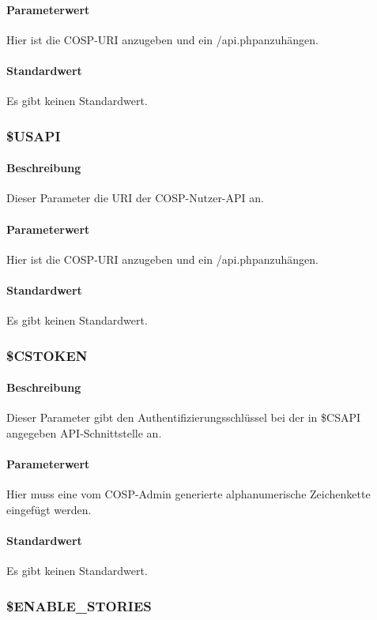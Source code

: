 \paragraph{Parameterwert}Hier ist die {\glqq COSP\grqq}-URI anzugeben und ein {\glqq /api.php\grqq}anzuhängen.
\paragraph{Standardwert}Es gibt keinen Standardwert.

\subsubsection{\$USAPI}
\paragraph{Beschreibung}Dieser Parameter die URI der {\glqq COSP\grqq}-Nutzer-API an.
\paragraph{Parameterwert}Hier ist die {\glqq COSP\grqq}-URI anzugeben und ein {\glqq /api.php\grqq}anzuhängen.
\paragraph{Standardwert}Es gibt keinen Standardwert.

\subsubsection{\$CSTOKEN}
\paragraph{Beschreibung}Dieser Parameter gibt den Authentifizierungsschlüssel bei der in {\glqq \$CSAPI\grqq} angegeben API-Schnittstelle an.
\paragraph{Parameterwert}Hier muss eine vom {\glqq COSP\grqq}-Admin generierte alphanumerische Zeichenkette eingefügt werden.
\paragraph{Standardwert}Es gibt keinen Standardwert.

\subsubsection{\$ENABLE\_STORIES}
